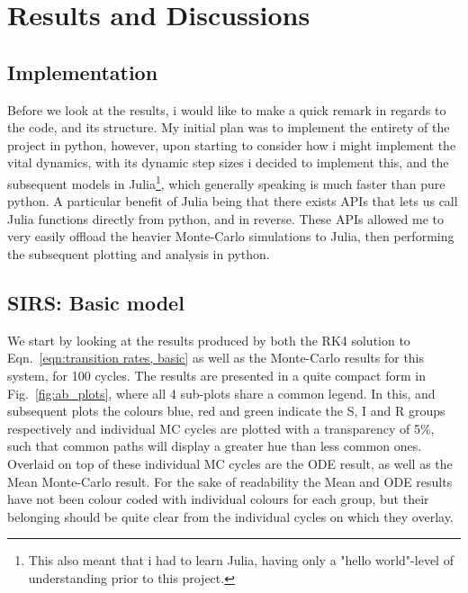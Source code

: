 \documentclass[10pt,showpacs,preprintnumbers,amsmath,amssymb,nofootinbib,aps,prl,twocolumn,groupedaddress,superscriptaddress,showkeys]{revtex4-1}
\begin{document}
\section{Results and Discussions}
  \subsection{Implementation}
    Before we look at the results, i would like to make a quick remark in regards to the code, and its structure. My initial plan was to implement the entirety of the project in python, however, upon starting to consider how i might implement the vital dynamics, with its dynamic step sizes i decided to implement this, and the subsequent models in Julia\footnote{This also meant that i had to learn Julia, having only a "hello world"-level of understanding prior to this project.}, which generally speaking is much faster than pure python. A particular benefit of Julia being that there exists APIs that lets us call Julia functions directly from python, and in reverse. These APIs allowed me to very easily offload the heavier Monte-Carlo simulations to Julia, then performing the subsequent plotting and analysis in python. 

  \subsection{SIRS: Basic model}
    We start by looking at the results produced by both the RK4 solution to Eqn.~\ref{eqn:transition rates, basic} as well as the Monte-Carlo results for this system, for 100 cycles. The results are presented in a quite compact form in Fig.~\ref{fig:ab_plots}, where all 4 sub-plots share a common legend. In this, and subsequent plots the colours blue, red and green indicate the S, I and R groups respectively and individual MC cycles are plotted with a transparency of 5\%, such that common paths will display a greater hue than less common ones. Overlaid on top of these individual MC cycles are the ODE result, as well as the Mean Monte-Carlo result. For the sake of readability the Mean and ODE results have not been colour coded with individual colours for each group, but their belonging should be quite clear from the individual cycles on which they overlay.
\end{document}

